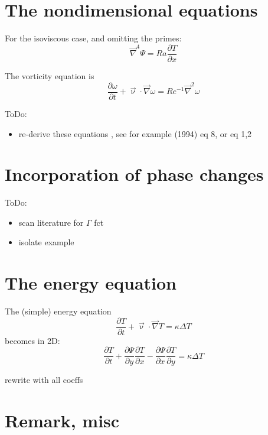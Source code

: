\section{The nondimensional equations}

For the isoviscous case, and omitting the primes:
\[
\vec\nabla^4 \Psi = Ra \frac{\partial T}{\partial x}
\]

The vorticity equation is
\[
\frac{\partial \omega}{\partial t} +\vec\upnu \cdot \vec\nabla \omega =
Re^{-1} \vec\nabla^2 \omega
\]




\vspace{0.5cm}

{\color{orange} 
ToDo: 
\begin{itemize}
\item re-derive these equations , see for example \textcite{sope94} (1994) eq 8, 
or \textcite{kopi79} eq 1,2
\end{itemize}
}

\section{Incorporation of phase changes}

\vspace{0.5cm}

{\color{orange} 
ToDo: 
\begin{itemize}
\item scan literature for $\Gamma$ fct
\item isolate example
\end{itemize}
}



\section{The energy equation}

The (simple) energy equation
\[
\frac{\partial T}{\partial t} + \vec\upnu \cdot \vec\nabla T = \kappa \Delta T
\]
becomes in 2D:
\[
\frac{\partial T}{\partial t} + 
\frac{\partial \Psi}{\partial y}\frac{\partial T}{\partial x} 
-\frac{\partial \Psi}{\partial x}\frac{\partial T}{\partial y} 
= \kappa \Delta T
\]

{\color{teal} rewrite with all coeffs}


\section{Remark, misc}

